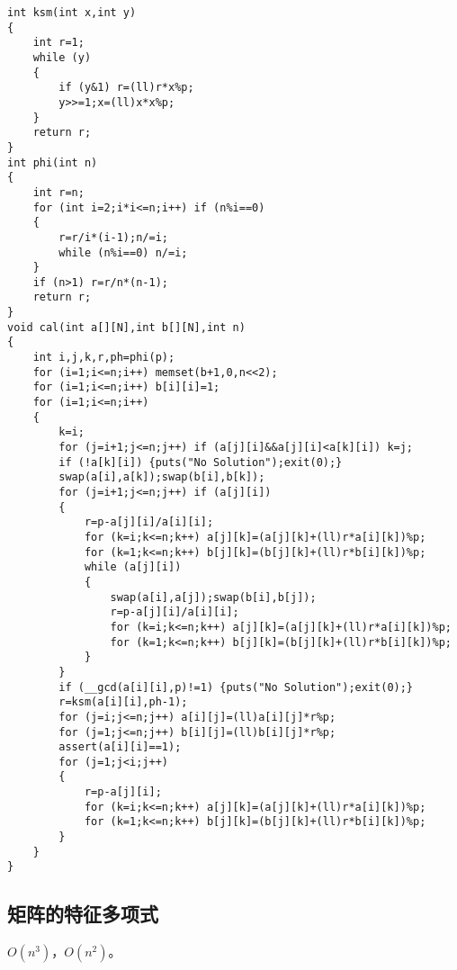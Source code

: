 \documentclass{ctexart}
\begin{document}
\begin{lstlisting}
int ksm(int x,int y)
{
	int r=1;
	while (y)
	{
		if (y&1) r=(ll)r*x%p;
		y>>=1;x=(ll)x*x%p;
	}
	return r;
}
int phi(int n)
{
	int r=n;
	for (int i=2;i*i<=n;i++) if (n%i==0)
	{
		r=r/i*(i-1);n/=i;
		while (n%i==0) n/=i;
	}
	if (n>1) r=r/n*(n-1);
	return r;
}
void cal(int a[][N],int b[][N],int n)
{
	int i,j,k,r,ph=phi(p);
	for (i=1;i<=n;i++) memset(b+1,0,n<<2);
	for (i=1;i<=n;i++) b[i][i]=1;
	for (i=1;i<=n;i++)
	{
		k=i;
		for (j=i+1;j<=n;j++) if (a[j][i]&&a[j][i]<a[k][i]) k=j;
		if (!a[k][i]) {puts("No Solution");exit(0);}
		swap(a[i],a[k]);swap(b[i],b[k]);
		for (j=i+1;j<=n;j++) if (a[j][i])
		{
			r=p-a[j][i]/a[i][i];
			for (k=i;k<=n;k++) a[j][k]=(a[j][k]+(ll)r*a[i][k])%p;
			for (k=1;k<=n;k++) b[j][k]=(b[j][k]+(ll)r*b[i][k])%p;
			while (a[j][i])
			{
				swap(a[i],a[j]);swap(b[i],b[j]);
				r=p-a[j][i]/a[i][i];
				for (k=i;k<=n;k++) a[j][k]=(a[j][k]+(ll)r*a[i][k])%p;
				for (k=1;k<=n;k++) b[j][k]=(b[j][k]+(ll)r*b[i][k])%p;
			}
		}
		if (__gcd(a[i][i],p)!=1) {puts("No Solution");exit(0);}
		r=ksm(a[i][i],ph-1);
		for (j=i;j<=n;j++) a[i][j]=(ll)a[i][j]*r%p;
		for (j=1;j<=n;j++) b[i][j]=(ll)b[i][j]*r%p;
		assert(a[i][i]==1);
		for (j=1;j<i;j++)
		{
			r=p-a[j][i];
			for (k=i;k<=n;k++) a[j][k]=(a[j][k]+(ll)r*a[i][k])%p;
			for (k=1;k<=n;k++) b[j][k]=(b[j][k]+(ll)r*b[i][k])%p;
		}
	}
}
\end{lstlisting}

\subsection{矩阵的特征多项式}

$O(n^3)$，$O(n^2)$。
\end{document}
